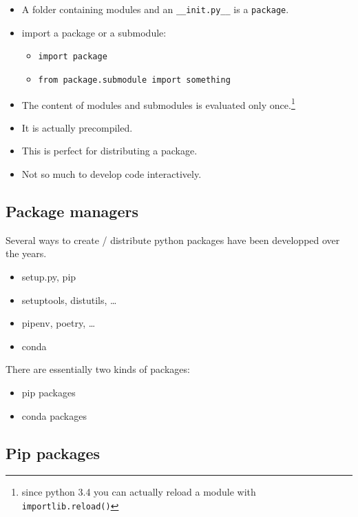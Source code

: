 \documentclass[
  letterpaper,
  DIV=11,
  numbers=noendperiod]{scrartcl}
\providecommand{\tightlist}{%
  \setlength{\itemsep}{0pt}\setlength{\parskip}{0pt}}\usepackage{longtable,booktabs,array}
\begin{document}
\begin{itemize}
\item
  A folder containing modules and an \texttt{\_\_init.py\_\_} is a
  \texttt{package}.
\item
  import a package or a submodule:

  \begin{itemize}
  \tightlist
  \item
    \texttt{import\ package}
  \item
    \texttt{from\ package.submodule\ import\ something}
  \end{itemize}
\item
  The content of modules and submodules is evaluated only
  once.\footnote{since python 3.4 you can actually reload a module with
    \texttt{importlib.reload()}}
\item
  It is actually precompiled.
\item
  This is perfect for distributing a package.
\item
  Not so much to develop code interactively.
\end{itemize}

\subsection{Package managers}\label{package-managers}

Several ways to create / distribute python packages have been developped
over the years.

\begin{itemize}
\tightlist
\item
  setup.py, pip
\item
  setuptools, distutils, \ldots{}
\item
  pipenv, poetry, \ldots{}
\item
  conda
\end{itemize}

There are essentially two kinds of packages:

\begin{itemize}
\tightlist
\item
  pip packages
\item
  conda packages
\end{itemize}

\subsection{Pip packages}\label{pip-packages}
\end{document}
